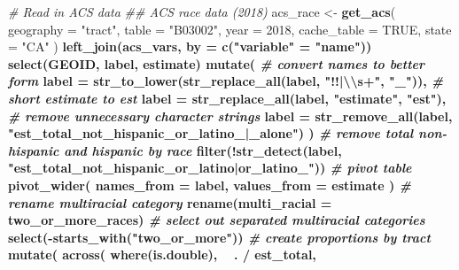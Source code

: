 \documentclass[
]{article}
\newenvironment{Shaded}{\begin{snugshade}}{\end{snugshade}}
\newcommand{\CharTok}[1]{\textcolor[rgb]{0.31,0.60,0.02}{#1}}
\newcommand{\CommentTok}[1]{\textcolor[rgb]{0.56,0.35,0.01}{\textit{#1}}}
\newcommand{\DataTypeTok}[1]{\textcolor[rgb]{0.13,0.29,0.53}{#1}}
\newcommand{\DecValTok}[1]{\textcolor[rgb]{0.00,0.00,0.81}{#1}}
\newcommand{\KeywordTok}[1]{\textcolor[rgb]{0.13,0.29,0.53}{\textbf{#1}}}
\newcommand{\NormalTok}[1]{#1}
\newcommand{\OperatorTok}[1]{\textcolor[rgb]{0.81,0.36,0.00}{\textbf{#1}}}
\newcommand{\OtherTok}[1]{\textcolor[rgb]{0.56,0.35,0.01}{#1}}
\newcommand{\StringTok}[1]{\textcolor[rgb]{0.31,0.60,0.02}{#1}}
\begin{document}
\begin{Shaded}
\begin{Highlighting}[]
{{{\CommentTok{# Read in ACS data}
\CommentTok{## ACS race data (2018)}
\NormalTok{acs_race <-}
\StringTok{  }\KeywordTok{get_acs}\NormalTok{(}
    \DataTypeTok{geography =} \StringTok{"tract"}\NormalTok{,}
    \DataTypeTok{table =} \StringTok{"B03002"}\NormalTok{,}
    \DataTypeTok{year =} \DecValTok{2018}\NormalTok{,}
    \DataTypeTok{cache_table =} \OtherTok{TRUE}\NormalTok{,}
    \DataTypeTok{state =} \StringTok{"CA"}
\NormalTok{  ) }\OperatorTok{%>%}
\StringTok{  }\KeywordTok{left_join}\NormalTok{(acs_vars, }\DataTypeTok{by =} \KeywordTok{c}\NormalTok{(}\StringTok{"variable"}\NormalTok{ =}\StringTok{ "name"}\NormalTok{)) }\OperatorTok{%>%}
\StringTok{  }\KeywordTok{select}\NormalTok{(GEOID, label, estimate) }\OperatorTok{%>%}
\StringTok{  }\KeywordTok{mutate}\NormalTok{(}
    \CommentTok{# convert names to better form}
    \DataTypeTok{label =} \KeywordTok{str_to_lower}\NormalTok{(}\KeywordTok{str_replace_all}\NormalTok{(label, }\StringTok{"!!|}\CharTok{\textbackslash{}\textbackslash{}}\StringTok{s+"}\NormalTok{, }\StringTok{"_"}\NormalTok{)),}
    \CommentTok{# short estimate to est}
    \DataTypeTok{label =} \KeywordTok{str_replace_all}\NormalTok{(label, }\StringTok{"estimate"}\NormalTok{, }\StringTok{"est"}\NormalTok{),}
    \CommentTok{# remove unnecessary character strings}
    \DataTypeTok{label =} \KeywordTok{str_remove_all}\NormalTok{(label, }\StringTok{"est_total_not_hispanic_or_latino_|_alone"}\NormalTok{)}
\NormalTok{   ) }\OperatorTok{%>%}
\StringTok{  }\CommentTok{# remove total non-hispanic and hispanic by race}
\StringTok{  }\KeywordTok{filter}\NormalTok{(}\OperatorTok{!}\KeywordTok{str_detect}\NormalTok{(label, }\StringTok{"est_total_not_hispanic_or_latino|or_latino_"}\NormalTok{)) }\OperatorTok{%>%}
\StringTok{  }\CommentTok{# pivot table}
\StringTok{  }\KeywordTok{pivot_wider}\NormalTok{(}
    \DataTypeTok{names_from =}\NormalTok{ label,}
    \DataTypeTok{values_from =}\NormalTok{ estimate}
\NormalTok{  ) }\OperatorTok{%>%}
\StringTok{  }\CommentTok{# rename multiracial category}
\StringTok{  }\KeywordTok{rename}\NormalTok{(}\DataTypeTok{multi_racial =}\NormalTok{ two_or_more_races) }\OperatorTok{%>%}
\StringTok{  }\CommentTok{# select out separated multiracial categories}
\StringTok{  }\KeywordTok{select}\NormalTok{(}\OperatorTok{-}\KeywordTok{starts_with}\NormalTok{(}\StringTok{"two_or_more"}\NormalTok{)) }\OperatorTok{%>%}
\StringTok{  }\CommentTok{# create proportions by tract}
\StringTok{  }\KeywordTok{mutate}\NormalTok{(}
    \KeywordTok{across}\NormalTok{(}
      \KeywordTok{where}\NormalTok{(is.double),}
      \OperatorTok{~}\StringTok{ }\NormalTok{. }\OperatorTok{/}\StringTok{ }\NormalTok{est_total,}
}}}}}}}}}}}
\end{Highlighting}
\end{Shaded}
\end{document}
